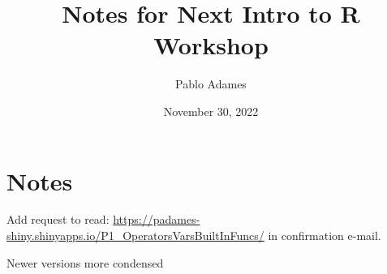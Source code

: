 \documentclass[12pt,dvipsnames]{article}
\title{Notes for Next Intro to R Workshop}
\author{Pablo Adames}
\date{November 30, 2022}
\begin{document}
\maketitle

\section*{Notes}

\begin{compactenum}
    \item Add request to read: \url{https://padames-shiny.shinyapps.io/P1_OperatorsVarsBuiltInFuncs/}
    in confirmation e-mail.
    \item Newer versions more condensed
\end{compactenum}



%
%


\end{document}

